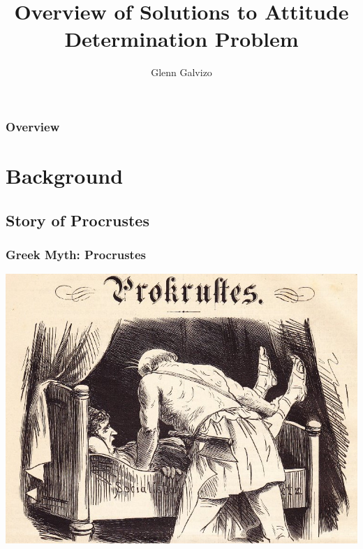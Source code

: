 \documentclass[11pt]{beamer}
\author{Glenn Galvizo}
\title{Overview of Solutions to Attitude Determination Problem}
\institute{University of Hawaii at Manoa}
\begin{document}
    \begin{frame}
        \titlepage
    \end{frame}

    \begin{frame}
        \frametitle{Overview}
        \tableofcontents
    \end{frame}

    \section{Background}\label{sec:background}
    \subsection{Story of Procrustes}\label{subsec:storyOfProcrustes}
    \begin{frame}
        \frametitle{Greek Myth: Procrustes}
        \centerline{\includegraphics[scale=1.3]{images/procrustes.jpg}}
    \end{frame}

\end{document}
